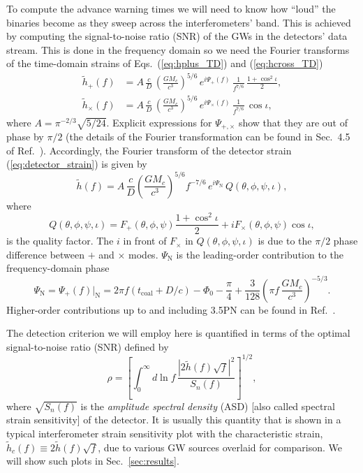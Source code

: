 \documentclass[amsmath,amssymb,aps,floats,amsfonts,notitlepage,superscriptaddress,eqsecnum,nofootinbib,10pt]{revtex4-1}
\newcommand{\f}{\frac}
\newcommand{\be}{\begin{equation}}
\newcommand{\ee}{\end{equation}}
\begin{document}
To compute the advance warning times we will need to know how ``loud'' the binaries become as they sweep across the interferometers' band.
This is achieved by computing the signal-to-noise ratio (SNR) of the GWs in the detectors' data stream.
This is done in the frequency domain so we need the Fourier transforms of the time-domain strains of Eqs.~(\ref{eq:hplus_TD}) and (\ref{eq:hcross_TD})
%
\begin{align}
 \tilde{h}_+(f) &= A \, \f{c}{D}\, \left(\f{G M_c}{c^3}\right)^{5/6}\, e^{i \Psi_+(f)}\, \f{1}{f^{7/6}}\,  \f{1+\cos^2\iota}{2}  ,\label{eq:hplus_FD}\\
 \tilde{h}_\times(f) & = A \, \f{c}{D}\, \left(\f{G M_c}{c^3}\right)^{5/6}\, e^{i \Psi_\times(f)}\, \f{1}{f^{7/6}}\, \cos\iota \label{eq:hcross_FD},
\end{align}
%
%
where $A= \pi^{-2/3} \sqrt{5/24}$.
Explicit expressions for $\Psi_{+,\times}$ show that they are out of phase by $\pi/2$
(the details of the Fourier transformation can be found in Sec.~4.5 of Ref.~\cite{Maggiore}).
Accordingly, the Fourier transform of the detector strain (\ref{eq:detector_strain}) is given by
%
\be
\tilde{h}(f) = A\, \f{c}{D}\left(\f{G M_c}{c^3}\right)^{5/6} f^{-7/6}\, e^{i\Psi_\text{N}}\, Q(\theta,\phi,\psi,\iota), \label{eq:strain_FD}
\ee
%
where 
%
\be
Q(\theta,\phi,\psi,\iota) = F_+(\theta,\phi,\psi)\f{1+\cos^2\iota}{2}  + i F_\times(\theta,\phi,\psi) \cos\iota \label{eq:Q},
\ee
%
is the quality factor.
The $i$ in front of $F_\times$ in $Q(\theta,\phi,\psi,\iota)$ is due to the $\pi/2$ phase difference between $+$ and $\times$ modes.
$\Psi_\text{N}$ is the leading-order contribution to the frequency-domain phase
%
\be
\Psi_\text{N}=\Psi_+(f)|_\text{N} = 2\pi f (t_\text{coal}+D/c)-\Phi_0-\f{\pi}{4}+ \f{3}{128}\left(\pi f\,\f{G M_c}{c^3}\right)^{-5/3} \label{eq:phase_FD}.
\ee
%
%
Higher-order contributions up to and including 3.5PN can be found in Ref.~\cite{SchutzLRR}.

The detection criterion we will employ here is quantified in terms of the optimal signal-to-noise ratio (SNR) defined by
%
\be
\rho=\left[ \int_0^\infty d\ln f\, \f{|2\tilde{h}(f)\sqrt{f}|^2}{S_n(f)}\right]^{1/2} \label{eq:SNR},
\ee
%
where $\sqrt{S_n(f)}$ is the {\it amplitude spectral density} (ASD) [also called spectral strain sensitivity] of the detector.
It is usually this quantity that is shown in a typical interferometer strain sensitivity plot with the characteristic strain, $\tilde{h}_c(f)\equiv2\tilde{h}(f)\sqrt{f}$, 
due to various GW sources overlaid for comparison. 
%
We will show such plots in Sec.~\ref{sec:results}.
\end{document}
